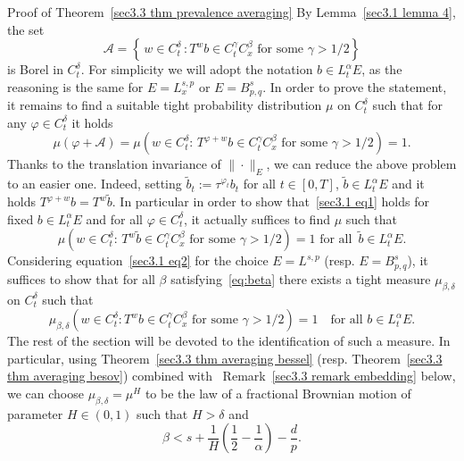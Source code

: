 \documentclass[10pt]{article}
\newcommand{\assign}{:=}
\newenvironment{proof*}[1]{\noindent\textbf{#1\ }}{\hspace*{\fill}$\Box$\medskip}
\begin{document}
\begin{proof*}{Proof of Theorem~\ref{sec3.3 thm prevalence averaging}}
  By Lemma~\ref{sec3.1 lemma 4}, the set
  \[ \mathcal{A} = \left\{ \, w \in C^{\delta}_t \, : T^w b \in C^{\gamma}_t
     C^{\beta}_x \text{ for some } \gamma > 1 / 2 \right\} \]
  is Borel in $C^{\delta}_t$. For simplicity we will adopt the notation $b \in
  L^{\alpha}_t E$, as the reasoning is the same for $E = L^{s, p}_x$ or $E =
  B^s_{p, q}$. In order to prove the statement, it remains to find a suitable
  tight probability distribution $\mu$ on $C^{\delta}_t$ such that for any
  $\varphi \in C^{\delta}_t$ it holds
  \begin{equation}
    \mu (\varphi + \mathcal{A}) = \mu \left( \text{$w \in C^{\delta}_t : \,
    T^{\varphi + w} b \in C^{\gamma}_t C^{\beta}_x$ for some $\gamma > 1 / 2$}
    \right) = 1. \label{sec3.1 eq1}
  \end{equation}
  Thanks to the translation invariance of $\| \cdot \|_E$, we can reduce the
  above problem to an easier one. Indeed, setting $\tilde{b}_t \assign
  \tau^{\varphi_t} b_t$ for all $t \in [0, T]$, $\tilde{b} \in L^{\alpha}_t E$
  and it holds $T^{\varphi + w} b = T^w \tilde{b}$. In particular in order to
  show that~{\eqref{sec3.1 eq1}} holds for fixed $b \in L^{\alpha}_t E$ and
  for all $\varphi \in C^{\delta}_t$, it actually suffices to find $\mu$ such
  that
  \begin{equation}
    \mu \left( \text{$w \in C^{\delta}_t : \, T^w \tilde{b} \in C^{\gamma}_t
    C^{\beta}_x$ for some $\gamma > 1 / 2$} \right) = 1 \text{ for all } \,
    \tilde{b} \in L^{\alpha}_t E. \label{sec3.1 eq2}
  \end{equation}
  Considering equation~{\eqref{sec3.1 eq2}} for the choice $E = L^{s, p}$
  (resp. $E = B^s_{p, q}$), it suffices to show that for all $\beta$
  satisfying~{\eqref{eq:beta}} there exists a tight measure $\mu_{\beta,
  \delta}$ on $C^{\delta}_t$ such that
  \begin{equation}
    \mu_{\beta, \delta} \left( w \in C^{\delta}_t : T^w b \in C^{\gamma}_t
    C^{\beta}_x \text{ for some } \gamma > 1 / 2 \right) = 1 \quad \text{for
    all } b \in L^{\alpha}_t E. \label{eq:prev-stat-averaging}
  \end{equation}
  The rest of the section will be devoted to the identification of such a
  measure. In particular, using Theorem~\ref{sec3.3 thm averaging bessel}
  (resp. Theorem~\ref{sec3.3 thm averaging besov}) combined with \
  Remark~\ref{sec3.3 remark embedding} below, we can choose $\mu_{\beta,
  \delta} = \mu^H$ to be the law of a fractional Brownian motion of parameter
  $H \in (0, 1)$ such that $H > \delta$ and
  \[ \beta < s + \frac{1}{H} \left( \frac{1}{2} - \frac{1}{\alpha} \right) -
     \frac{d}{p} . \]
\end{proof*}
\end{document}
